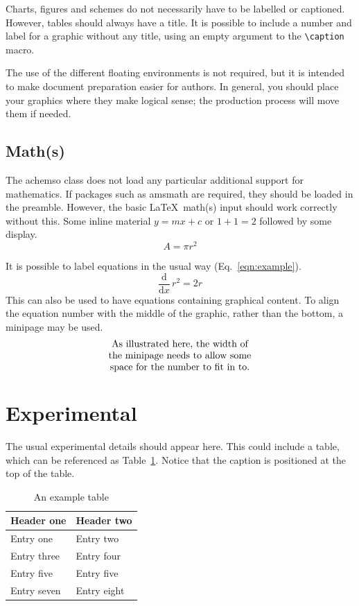 Charts, figures and schemes do not necessarily have to be labelled or
captioned.  However, tables should always have a title. It is
possible to include a number and label for a graphic without any
title, using an empty argument to the \texttt{\textbackslash caption}
macro.

The use of the different floating environments is not required, but
it is intended to make document preparation easier for authors. In
general, you should place your graphics where they make logical
sense; the production process will move them if needed.

\subsection{Math(s)}

The \textsf{achemso} class does not load any particular additional
support for mathematics.  If packages such as \textsf{amsmath} are
required, they should be loaded in the preamble.  However,
the basic \LaTeX\ math(s) input should work correctly without
this.  Some inline material \( y = mx + c \) or $ 1 + 1 = 2 $
followed by some display. \[ A = \pi r^2 \]

It is possible to label equations in the usual way (Eq.~\ref{eqn:example}).
\begin{equation}
  \frac{\mathrm{d}}{\mathrm{d}x} \, r^2 = 2r \label{eqn:example}
\end{equation}
This can also be used to have equations containing graphical
content. To align the equation number with the middle of the graphic,
rather than the bottom, a minipage may be used.
\begin{equation}
  \begin{minipage}[c]{0.80\linewidth}
    \centering
    As illustrated here, the width of \\
    the minipage needs to allow some  \\
    space for the number to fit in to.
  \end{minipage}
  \label{eqn:graphic}
\end{equation}

\section{Experimental}

The usual experimental details should appear here.  This could
include a table, which can be referenced as Table~\ref{tbl:example}.
Notice that the caption is positioned at the top of the table.
\begin{table}
  \caption{An example table}
  \label{tbl:example}
  \begin{tabular}{ll}
    \hline
    Header one  & Header two  \\
    \hline
    Entry one   & Entry two   \\
    Entry three & Entry four  \\
    Entry five  & Entry five  \\
    Entry seven & Entry eight \\
    \hline
  \end{tabular}
\end{table}

